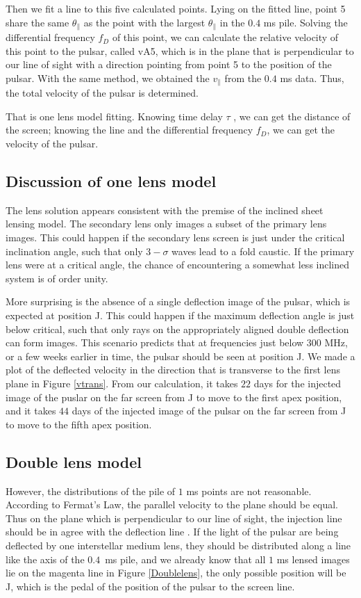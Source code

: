 \documentclass{emulateapj}
\begin{document}
Then we fit a line to this five calculated points. Lying on the fitted line, point 5 share the same $\theta_{\parallel}$ as the point with the largest $\theta_{\parallel}$ in the $0.4$ ms pile. Solving the differential frequency ${f_D}$ of this point, we can calculate the relative velocity of this point to the pulsar, called vA5, which is in the plane that is perpendicular to our line of sight with a direction pointing from point 5 to the position of the pulsar. With the same method, we obtained the $v_{\parallel}$ from the $0.4$ ms data. Thus, the total velocity of the pulsar is determined.

That is one lens model fitting. Knowing time delay ${\tau}$ , we can get the distance of the screen; knowing the line and the differential frequency ${f_D}$, we can get the velocity of the pulsar.
\subsection{Discussion of one lens model}

The lens solution appears consistent with the premise of the inclined
sheet lensing model\citep{2014MNRAS.442.3338P}.  The secondary lens
only images a subset of the primary lens images.  This could happen if
the secondary lens screen is just under the critical inclination
angle, such that only $3-\sigma$ waves lead to a fold caustic.  If the
primary lens were at a critical angle, the chance of encountering a
somewhat less inclined system is of order unity.

More surprising is the absence of a single deflection image of the
pulsar, which is expected at position J.  This could happen if the
maximum deflection angle is just below critical, such that only rays
on the appropriately aligned double deflection can form images.  This
scenario predicts that at frequencies just below $300$ MHz, or a few
weeks earlier in time, the pulsar should be seen at position J. We made a plot of the deflected velocity in the direction that is transverse to the first lens plane in Figure \ref{vtrans}.
From our calculation, it takes $22$ days for the injected image of the puslar on the far screen from J to move to the first apex position, and it takes $44$ days of the injected image of the pulsar on the far screen from J to move to the fifth apex position.

\subsection{Double lens model}
However, the distributions of the pile of $1$ ms points are not reasonable. According to Fermat's Law, the parallel velocity to the plane should be equal. Thus on the plane which is perpendicular to our line of sight, the injection line should be in agree with the deflection line . If the light of the pulsar are being deflected by one interstellar medium lens, they should be distributed along a line like the axis of the $0.4$\ ms pile, and we already know that all $1$ ms lensed images lie on the magenta line in Figure \ref{Doublelens}, the only possible position will be J, which is the pedal of the position of the pulsar to the screen line.
\end{document}
